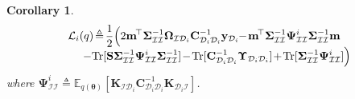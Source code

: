 \documentclass[conference]{IEEEtran}
\newtheorem{corollary}{Corollary}
\begin{document}
\begin{corollary}
\begin{equation*}
\begin{array}{l}
			\mathcal{L}_i(q)\hspace{-0.5mm}\triangleq\hspace{-0.5mm}\displaystyle \frac{1}{2}\Big(2\mathbf{m}^{\hspace{-0.5mm}\top}\mathbf{\Sigma}_\mathcal{II}^{-1}\mathbf{\Omega}_{\mathcal{I}\mathcal{D}_i}\mathbf{C}_{\mathcal{D}_i\mathcal{D}_i}^{-1}\mathbf{y}_{\mathcal{D}_i}\hspace{-1mm}-\hspace{-0.5mm}\mathbf{m}^{\hspace{-0.5mm}\top}\mathbf{\Sigma}_\mathcal{II}^{-1}\mathbf{\Psi}_\mathcal{II}^{i}\mathbf{\Sigma}_\mathcal{II}^{-1}\mathbf{m}\\
			\quad\ \displaystyle -\mathrm{Tr}[\mathbf{S}\mathbf{\Sigma}_\mathcal{II}^{-1}\mathbf{\Psi}_\mathcal{II}^{i}\mathbf{\Sigma}_\mathcal{II}^{-1}]\hspace{-0.5mm}-\hspace{-0.5mm}\mathrm{Tr}[\mathbf{C}_{\mathcal{D}_i\mathcal{D}_i}^{-1}\mathbf{\Upsilon}_{\mathcal{D}_i\mathcal{D}_i}] \hspace{-0.5mm}+\hspace{-0.5mm}\mathrm{Tr}[\mathbf{\Sigma}_\mathcal{II}^{-1}\mathbf{\Psi}_\mathcal{II}^{i}]\Big)%
		\end{array}
		\label{Lower Bound}		
	\end{equation*}
	where 
	$\mathbf{\Psi}_\mathcal{II}^{i}\triangleq\mathbb{E}_{q(\boldsymbol{\theta})}[\mathbf{K}_{\mathcal{I}\mathcal{D}_i}\mathbf{C}^{-1}_{\mathcal{D}_i\mathcal{D}_i}\mathbf{K}_{\mathcal{D}_i\mathcal{I}}]$.\vspace{1mm}
	\label{decompo}
\end{corollary}	 
	
\end{document}
